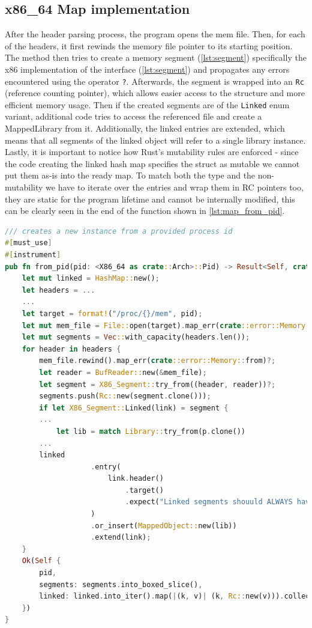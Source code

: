 \subsection{x86\_64 Map implementation}

After the header parsing process, the program opens the mem file.
Then, for each of the headers, it first rewinds the memory file pointer to its starting position.
The method then tries to create a memory segment (\autoref{lst:segment}) specifically the x86 implementation of the interface (\autoref{lst:segment}) and propagates any errors encountered using the operator \verb|?|.
Afterwards, the segment is wrapped into an \verb|Rc| (reference counting pointer), which allows easier access to the structure and more efficient memory usage.
Then if the created segments are of the \verb|Linked| enum variant, additional code tries to access the referenced file and create a MappedLibrary from it.
Additionally, the linked entries are extended, which means that all segments of the linked object will refer to a single library instance.
Lastly, it is important to notice how Rust's mutability rules are enforced - since the code creating the linked hash map specifies the struct as mutable we cannot put them as-is into the ready map.
To match both the type and the non-mutability we have to iterate over the entries and wrap them in RC pointers too, they are static for the program lifetime and cannot be internally modified, this can be clearly seen in the end of the function shown in \autoref{lst:map_from_pid}.

\begin{lstlisting}[caption=\label{lst:map_from_pid}{Excerpt from x86\_64 Map's from\_pid function}, language=Rust, breaklines=true]
/// creates a new instance from a provided process id
#[must_use]
#[instrument]
pub fn from_pid(pid: <X86_64 as crate::Arch>::Pid) -> Result<Self, crate::error::Error> {
    let mut linked = HashMap::new();
    let headers = ...
    ...
    let target = format!("/proc/{}/mem", pid);
    let mut mem_file = File::open(target).map_err(crate::error::Memory::from)?;
    let mut segments = Vec::with_capacity(headers.len());
    for header in headers {
        mem_file.rewind().map_err(crate::error::Memory::from)?;
        let reader = BufReader::new(&mem_file);
        let segment = X86_Segment::try_from((header, reader))?;
        segments.push(Rc::new(segment.clone()));
        if let X86_Segment::Linked(link) = segment {
        ...
            let lib = match Library::try_from(p.clone())
        ...
        linked
                    .entry(
                        link.header()
                            .target()
                            .expect("Linked segments shouuld ALWAYS have a valid target"),
                    )
                    .or_insert(MappedObject::new(lib))
                    .extend(link);
    }
    Ok(Self {
        pid,
        segments: segments.into_boxed_slice(),
        linked: linked.into_iter().map(|(k, v)| (k, Rc::new(v))).collect(),
    })
}
\end{lstlisting}

